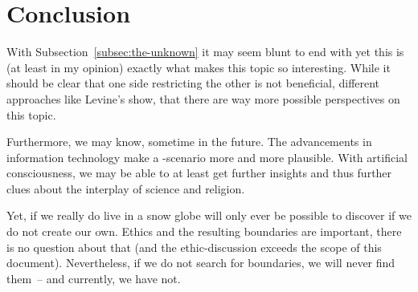 \section{Conclusion}
\label{sec:Conclusion}

With Subsection~\ref{subsec:the-unknown} it may seem blunt to end with  yet this is (at least in my opinion) exactly what makes this topic so interesting.
While it should be clear that one side restricting the other is not beneficial, different approaches like Levine's  show, that there are way more possible perspectives on this topic.

Furthermore, we may know, sometime in the future. The advancements in information technology make a -scenario more and more plausible.
With artificial consciousness, we may be able to at least get further insights and thus further clues about the interplay of science and religion.

Yet, if we really do live in a snow globe will only ever be possible to discover if we do not create our own. Ethics and the resulting boundaries are important, there is no question about that (and the ethic-discussion exceeds the scope of this document).
Nevertheless, if we do not search for boundaries, we will never find them~-- and currently, we have not.





